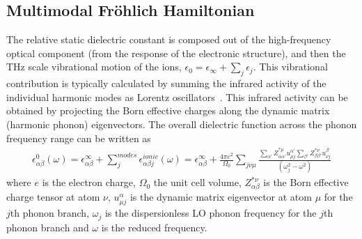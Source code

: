 \subsection{Multimodal Fr\"ohlich Hamiltonian}

The relative static dielectric constant is composed out of the high-frequency optical component (from the response of the electronic structure), and then the THz scale vibrational motion of the ions, $\epsilon_{0}=\epsilon_{\infty}+ \sum_j \epsilon_{j}$. This vibrational contribution is typically calculated by summing the infrared activity of the individual harmonic modes as Lorentz oscillators~\cite{gonze_dynamical_1997}. This infrared activity can be obtained by projecting the Born effective charges along the dynamic matrix (harmonic phonon) eigenvectors. The overall dielectric function across the phonon frequency range can be written as 
\begin{equation}
    \begin{gathered}
    \epsilon^0_{\alpha \beta}(\omega) = \epsilon^{\infty}_{\alpha \beta} + \sum_{j}^{modes} \epsilon^{ionic}_{\alpha \beta j}(\omega)
    = \epsilon^{\infty}_{\alpha \beta} + \frac{4\pi e^2}{\Omega_0} \sum_{j \nu\mu}\frac{ \sum_{\alpha'}Z^{*\mu}_{\alpha\alpha'} u_{\mu j}^{\alpha'}  \sum_{\beta'}Z^{*\nu}_{\beta\beta'}  u_{\nu j}^{\beta'}}{\left(\omega_{j}^2 - \omega^2   \right)}
    \end{gathered}
\end{equation}
where $e$ is the electron charge, $\Omega_0$ the unit cell volume, $Z^{*\nu}_{\alpha \beta}$ is the Born effective charge tensor at atom $\nu$, $u^\alpha_{\mu j}$ is the dynamic matrix eigenvector at atom $\mu$ for the $j$th phonon branch, $\omega_{j}$ is the dispersionless LO phonon frequency for the $j$th phonon branch and $\omega$ is the reduced frequency. 

